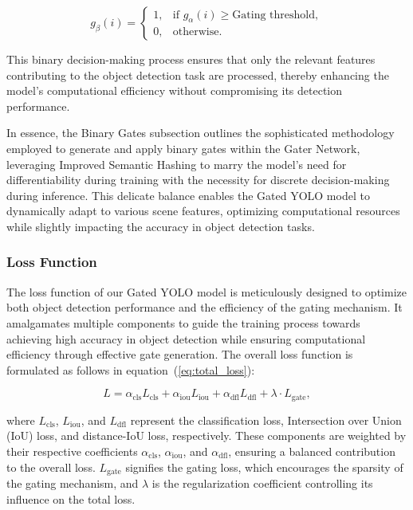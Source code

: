 \begin{equation}
g_{\beta}(i) = 
\begin{cases}
1, & \text{if } g_{\alpha}(i) \geq \text{Gating threshold},\\
0, & \text{otherwise}.
\end{cases}
\label{eq:hard_binary_decision}
\end{equation}

This binary decision-making process ensures that only the relevant features contributing to the object detection task are processed, thereby enhancing the model's computational efficiency without compromising its detection performance.

In essence, the Binary Gates subsection outlines the sophisticated methodology employed to generate and apply binary gates within the Gater Network, leveraging Improved Semantic Hashing to marry the model's need for differentiability during training with the necessity for discrete decision-making during inference. This delicate balance enables the Gated YOLO model to dynamically adapt to various scene features, optimizing computational resources while slightly impacting the accuracy in object detection tasks.

\subsubsection{Loss Function}
The loss function of our Gated YOLO model is meticulously designed to optimize both object detection performance and the efficiency of the gating mechanism. It amalgamates multiple components to guide the training process towards achieving high accuracy in object detection while ensuring computational efficiency through effective gate generation. The overall loss function is formulated as follows in equation~(\ref{eq:total_loss}):

\begin{equation}
L = \alpha_{\text{cls}} L_{\text{cls}} + \alpha_{\text{iou}} L_{\text{iou}} + \alpha_{\text{dfl}} L_{\text{dfl}} + \lambda \cdot L_{\text{gate}},
\label{eq:total_loss}
\end{equation}

where \(L_{\text{cls}}\), \(L_{\text{iou}}\), and \(L_{\text{dfl}}\) represent the classification loss, Intersection over Union (IoU) loss, and distance-IoU loss, respectively. These components are weighted by their respective coefficients \(\alpha_{\text{cls}}\), \(\alpha_{\text{iou}}\), and \(\alpha_{\text{dfl}}\), ensuring a balanced contribution to the overall loss. \(L_{\text{gate}}\) signifies the gating loss, which encourages the sparsity of the gating mechanism, and \(\lambda\) is the regularization coefficient controlling its influence on the total loss.

